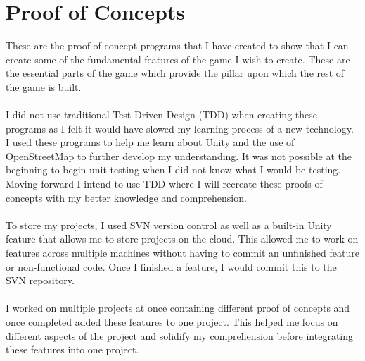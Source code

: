 \documentclass[a4paper]{report}
\begin{document}
\section{Proof of Concepts}
These are the proof of concept programs that I have created to show that I can create some of the fundamental features of the game I wish to create. These are the essential parts of the game which provide the pillar upon which the rest of the game is built.
\\\\
I did not use traditional Test-Driven Design (TDD) when creating these programs as I felt it would have slowed my learning process of a new technology. I used these programs to help me learn about Unity and the use of OpenStreetMap to further develop my understanding. It was not possible at the beginning to begin unit testing when I did not know what I would be testing. Moving forward I intend to use TDD where I will recreate these proofs of concepts with my better knowledge and comprehension.
\\\\
To store my projects, I used SVN version control as well as a built-in Unity feature that allows me to store projects on the cloud. This allowed me to work on features across multiple machines without having to commit an unfinished feature or non-functional code. Once I finished a feature, I would commit this to the SVN repository. 
\\\\
I worked on multiple projects at once containing different proof of concepts and once completed added these features to one project. This helped me focus on different aspects of the project and solidify my comprehension before integrating these features into one project.
\end{document}
